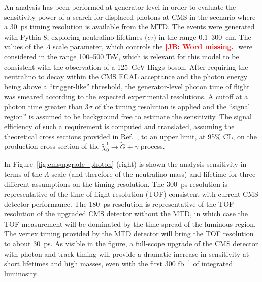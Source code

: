 An analysis has been performed at generator level in order to evaluate the sensitivity power of a search for displaced photons at CMS in the scenario where a 30~ps timing resolution is available from the MTD. The events were generated with Pythia 8, exploring neutralino lifetimes ($c\tau$) in the range 0.1--300~cm. The values of the $\Lambda$ scale parameter, which controls the {\bf \textcolor{red}{[JB: Word missing.]}} were considered in the range 100--500 TeV, which is relevant for this model to be consistent with the observation of a 125~GeV Higgs boson. After requiring the neutralino to decay within the CMS ECAL acceptance and the photon energy being above a ``trigger-like'' threshold, the generator-level photon time of flight was smeared according to the expected experimental resolutions. A cutoff at a photon time greater than 3$\sigma$ of the timing resolution is applied and the ``signal region'' is assumed to be background free to estimate the sensitivity. The signal efficiency of such a requirement is computed and translated, assuming the theoretical cross sections provided in Ref.~\cite{ref:GMSB}, to an upper limit, at 95\% CL, on the production cross section of the $\tilde{\chi}_0^1 \to \tilde{G} + \gamma$ process.

In Figure~\ref{fig:cmsupgrade_photon} (right) is shown the analysis sensitivity in terms of the $\Lambda$ scale (and therefore of the neutralino mass) and lifetime for three different assumptions on the timing resolution. The 300~ps resolution is representative of the time-of-flight resolution (TOF) consistent with current CMS detector performance. The 180~ps resolution is representative of the TOF resolution of the upgraded CMS detector without the MTD, in which case the TOF measurement will be dominated by the time spread of the luminous region. The vertex timing provided by the MTD detector will bring the TOF resolution to about 30~ps. As visible in the figure, a full-scope upgrade of the CMS detector with photon and track timing will provide a dramatic increase in sensitivity at short lifetimes and high masses, even with the first $300\,\,\mathrm{fb}^{-1}$ of integrated luminosity.

